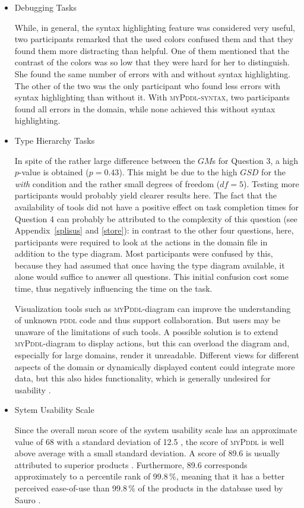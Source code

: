 \documentclass[runningheads]{llncs}
\newcommand{\mypddl}{\textsc{myPddl}\xspace}
\newcommand{\mypddlsyntax}{\textsc{myPddl-syntax}\xspace}
\newcommand{\pddl}{\textsc{pddl}\xspace}
\begin{document}
\begin{itemize}
\item Debugging Tasks

  While, in general, the syntax highlighting feature was considered
  very useful, two participants remarked that the used colors confused
  them and that they found them more distracting than helpful. One of
  them mentioned that the contrast of the colors was so low that they
  were hard for her to distinguish. She found the same number of
  errors with and without syntax highlighting. The other of the two
  was the only participant who found less errors with syntax
  highlighting than without it. With \mypddlsyntax, two participants
  found all errors in the domain, while none achieved this without
  syntax highlighting.

\item Type Hierarchy Tasks

  In spite of the rather large difference between the $GM$s for
  Question 3, a high $p$-value is obtained ($p = 0.43$). This might be
  due to the high $GSD$ for the \emph{with} condition and the rather
  small degrees of freedom ($df = 5$). Testing more participants would
  probably yield clearer results here. The fact that the availability
  of tools did not have a positive effect on task completion times for
  Question 4 can probably be attributed to the complexity of this
  question (see Appendix~\ref{splisus} and \ref{store}): in contrast
  to the other four questions, here, participants were required to
  look at the actions in the domain file in addition to the type
  diagram. Most participants were confused by this, because they had
  assumed that once having the type diagram available, it alone would
  suffice to answer all questions. This initial confusion cost some
  time, thus negatively influencing the time on the task.

  Visualization tools such as \mypddl -diagram can improve the
  understanding of unknown \pddl code and thus support
  collaboration. But users may be unaware of the limitations of such
  tools. A possible solution is to extend \mypddl -diagram to display
  actions, but this can overload the diagram and, especially for large
  domains, render it unreadable. Different views for different aspects
  of the domain or dynamically displayed content could integrate more
  data, but this also hides functionality, which is generally
  undesired for usability \cite{norman2002design}.

\item Sytem Usability Scale

Since the overall mean score of the system usability scale has an
approximate value of 68 with a standard deviation of 12.5
\cite{sauro2011practical}, the score of \mypddl is well above average
with a small standard deviation. A score of 89.6 is usually attributed
to superior products \cite{bangor2008empirical}. Furthermore, 89.6
corresponds approximately to a percentile rank of 99.8\,\%, meaning
that it has a better perceived ease-of-use than 99.8\,\% of the
products in the database used by Sauro \cite{sauro2011practical}.

\end{itemize}
\end{document}
